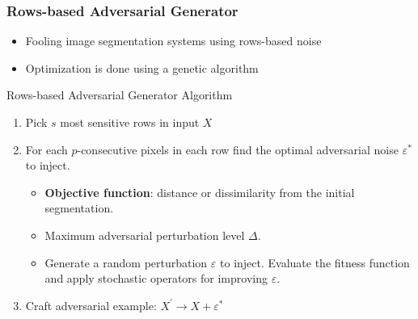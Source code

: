 \documentclass{beamer}
\begin{document}
\begin{frame}
  \frametitle{Rows-based Adversarial Generator}
	\begin{itemize}
		\item Fooling image segmentation systems using rows-based noise
		\item Optimization is done using a genetic algorithm
	\end{itemize}
	\begin{block}{Rows-based Adversarial Generator Algorithm}

		\begin{enumerate}
			\item Pick $s$ most sensitive rows in input $X$
			\item For each $p$-consecutive pixels in each row find the optimal adversarial noise $\varepsilon^*$ to inject.
			\begin{itemize}
				\item \textbf{Objective function}: distance or dissimilarity from the initial segmentation. 
	
				\item Maximum adversarial perturbation level $\Delta$.
				
				\item Generate a random perturbation $\varepsilon$ to inject. Evaluate the fitness function and apply stochastic operators for improving $\varepsilon$.
			\end{itemize}
			\item Craft adversarial example: $X^\prime\rightarrow X + \varepsilon^*$
		\end{enumerate}

	\end{block}
\end{frame}
\end{document}
